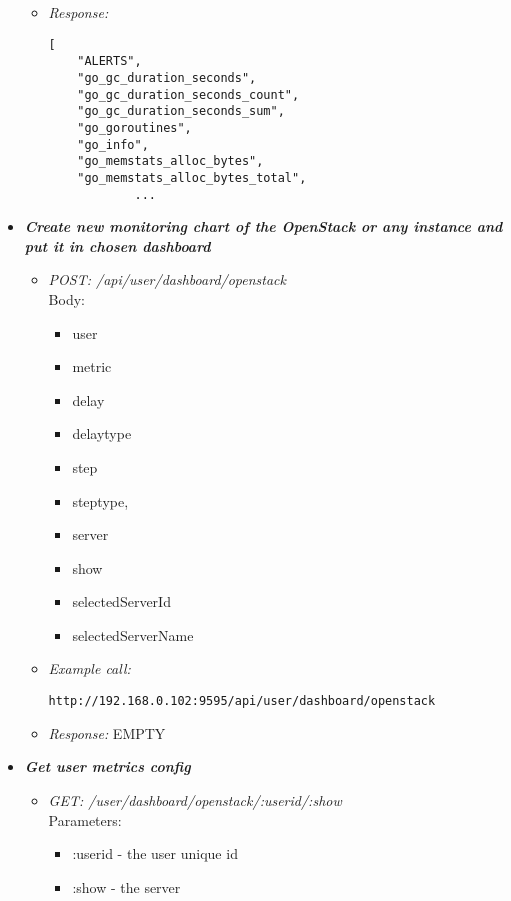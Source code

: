 \begin{itemize}
\begin{itemize}
\item \emph{Response:}
 \begin{lstlisting}
[
    "ALERTS",
    "go_gc_duration_seconds",
    "go_gc_duration_seconds_count",
    "go_gc_duration_seconds_sum",
    "go_goroutines",
    "go_info",
    "go_memstats_alloc_bytes",
    "go_memstats_alloc_bytes_total",
            ...
\end{lstlisting}
\end{itemize}


\item \textbf{\textit{Create new monitoring chart of the OpenStack or any instance and put it in chosen dashboard}}
\begin{itemize}
\item \emph{POST: /api/user/dashboard/openstack}
\\Body:
\begin{itemize}
\item  user
\item  metric
\item  delay
\item  delaytype
\item  step
\item steptype,
\item server
\item  show
\item selectedServerId
\item selectedServerName
\end{itemize}

\item \emph{Example call:}
 \begin{lstlisting}
http://192.168.0.102:9595/api/user/dashboard/openstack
\end{lstlisting}

\item \emph{Response:} EMPTY
\end{itemize}


\item \textbf{\textit{Get user metrics config}}
\begin{itemize}
\item \emph{GET: /user/dashboard/openstack/:userid/:show}
\\Parameters:
\begin{itemize}
\item :userid - the user unique id
\item :show - the server 
\end{itemize}


\end{itemize}
\end{itemize}
